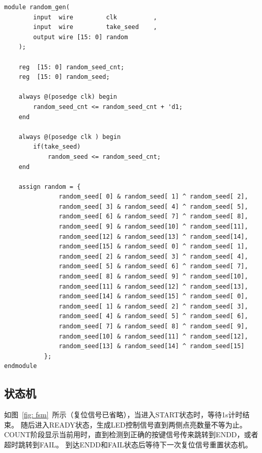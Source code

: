 \begin{lstlisting}
module random_gen(
        input  wire         clk          ,
        input  wire         take_seed    ,
        output wire [15: 0] random
    );

    reg  [15: 0] random_seed_cnt;
    reg  [15: 0] random_seed;

    always @(posedge clk) begin
        random_seed_cnt <= random_seed_cnt + 'd1;
    end

    always @(posedge clk ) begin
        if(take_seed)
            random_seed <= random_seed_cnt;
    end

    assign random = {
               random_seed[ 0] & random_seed[ 1] ^ random_seed[ 2],
               random_seed[ 3] & random_seed[ 4] ^ random_seed[ 5],
               random_seed[ 6] & random_seed[ 7] ^ random_seed[ 8],
               random_seed[ 9] & random_seed[10] ^ random_seed[11],
               random_seed[12] & random_seed[13] ^ random_seed[14],
               random_seed[15] & random_seed[ 0] ^ random_seed[ 1],
               random_seed[ 2] & random_seed[ 3] ^ random_seed[ 4],
               random_seed[ 5] & random_seed[ 6] ^ random_seed[ 7],
               random_seed[ 8] & random_seed[ 9] ^ random_seed[10],
               random_seed[11] & random_seed[12] ^ random_seed[13],
               random_seed[14] & random_seed[15] ^ random_seed[ 0],
               random_seed[ 1] & random_seed[ 2] ^ random_seed[ 3],
               random_seed[ 4] & random_seed[ 5] ^ random_seed[ 6],
               random_seed[ 7] & random_seed[ 8] ^ random_seed[ 9],
               random_seed[10] & random_seed[11] ^ random_seed[12],
               random_seed[13] & random_seed[14] ^ random_seed[15]
           };
endmodule

\end{lstlisting}

\subsection{状态机}
如图~\ref{fig: fsm}~所示（复位信号已省略），当进入START状态时，等待1s计时结束。
随后进入READY状态，生成LED控制信号直到两侧点亮数量不等为止。
COUNT阶段显示当前用时，直到检测到正确的按键信号传来跳转到ENDD，或者超时跳转到FAIL。
到达ENDD和FAIL状态后等待下一次复位信号重置状态机。

